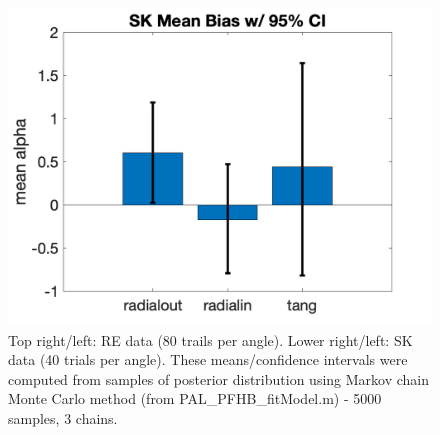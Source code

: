 \documentclass[11pt]{article} %
\begin{document}
\begin{figure}[H]
\includegraphics[scale=.2]{Images/MeanBiasError_95ci_SK.png}
\caption{Top right/left: RE data (80 trails per angle). Lower right/left: SK data (40 trials per angle). These means/confidence intervals were computed from samples of posterior distribution using Markov chain Monte Carlo method (from PAL\_PFHB\_fitModel.m) - 5000 samples, 3 chains.}
\end{figure}
\end{document}
